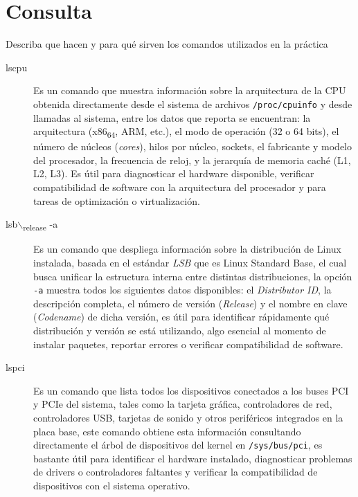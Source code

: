 \documentclass{article}
\begin{document}
\section{Consulta}
\label{sec:orgc93039d}
Describa que hacen y para qué sirven los comandos utilizados en la práctica

\begin{description}
\item[{lscpu}] Es un comando que muestra información sobre la arquitectura de la
CPU obtenida directamente desde el sistema de archivos \texttt{/proc/cpuinfo}
y desde llamadas al sistema, entre los datos que reporta
se encuentran: la arquitectura (x86\textsubscript{64}, ARM, etc.), el modo de
operación (32 o 64 bits), el número de núcleos (\emph{cores}), hilos por
núcleo, sockets, el fabricante y modelo del procesador, la
frecuencia de reloj, y la jerarquía de memoria caché (L1, L2, L3).
Es útil para diagnosticar el hardware disponible, verificar
compatibilidad de software con la arquitectura del procesador y
para tareas de optimización o virtualización.
\item[{lsb$\backslash$\textsubscript{release} -a}] Es un comando que despliega información sobre la distribución de
Linux instalada, basada en el estándar \emph{LSB} que es Linux Standard Base,
el cual busca unificar la estructura interna entre distintas
distribuciones, la opción \texttt{-a} muestra todos los siguientes datos
disponibles: el \emph{Distributor ID}, la descripción completa, el número de versión (\emph{Release}) y
el nombre en clave (\emph{Codename}) de dicha versión, es útil para
identificar rápidamente qué distribución y versión se está
utilizando, algo esencial al momento de instalar paquetes,
reportar errores o verificar compatibilidad de software.
\item[{lspci}] Es un comando que lista todos los dispositivos conectados a los
buses PCI y PCIe del sistema, tales como la tarjeta gráfica, controladores
de red, controladores USB, tarjetas de sonido y otros periféricos integrados en la
placa base, este comando obtiene esta información consultando directamente el
árbol de dispositivos del kernel en \texttt{/sys/bus/pci}, es bastante útil para
identificar el hardware instalado, diagnosticar problemas de
drivers o controladores faltantes y verificar la compatibilidad
de dispositivos con el sistema operativo.
\end{description}
\end{document}
